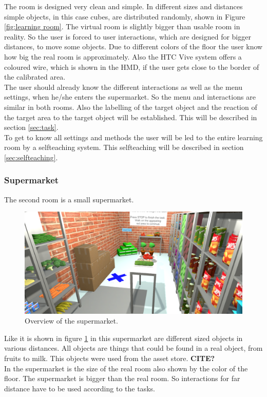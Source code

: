 The room is designed very clean and simple. In different sizes and distances simple objects, in this case cubes, are distributed randomly, shown in Figure \ref{fig:learning room}. The virtual room is slightly bigger than usable room in reality. So the user is forced to user interactions, which are designed for bigger distances, to move some objects. Due to different colors of the floor the user know how big the real room is approximately. Also the HTC Vive system offers a coloured wire, which is shown in the HMD, if the user gets close to the border of the calibrated area.\\
The user should already know the different interactions as well as the menu settings, when he/she enters the supermarket. So the menu and interactions are similar in both rooms. Also the labelling of the target object and the reaction of the target area to the target object will be established. This will be described in section \ref{sec:task}.\\ 
To get to know all settings and methods the user will be led to the entire learning room by a selfteaching system. This selfteaching will be described in section \ref{sec:selfteaching}. 


\subsubsection{Supermarket} \label{sec:supermarket} %
The second room is a small supermarket. 

\begin{figure}[H] 
	\center 
	\includegraphics[width=12cm]{Images/supermarket.PNG}
	\caption[Overview of the supermarket.]{Overview of the supermarket.}
	\label{fig:supermarket}
\end{figure}

Like it is shown in figure \ref{fig:supermarket} in this supermarket are different sized objects in various distances. All objects are things that could be found in a real object, from fruits to milk. This objects were used from the asset store. \textbf{CITE?}\\
In the supermarket is the size of the real room also shown by the color of the floor. The supermarket is bigger than the real room. So interactions for far distance have to be used according to the tasks.

